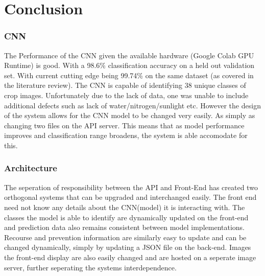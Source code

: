 \chapter{Conclusion}
\label{conclusion}
  \subsection{CNN}
    The Performance of the CNN given the available hardware (Google Colab GPU Runtime) is good. With a 98.6\% classification accuracy on a held out validation set. With current cutting edge being 99.74\% on the same dataset (as covered in the literature review). The CNN is capable of identifying 38 unique classes of crop images. Unfortunately due to the lack of data, one was unable to include additional defects such as lack of water/nitrogen/sunlight etc. However the design of the system allows for the CNN model to be changed very easily. As simply as changing two files on the API server. This means that as model performance improves and classification range broadens, the system is able accomodate for this.

  \subsection{Architecture}
    The seperation of responsibility between the API and Front-End has created two orthogonal systems that can be upgraded and interchanged easily. The front end need not know any details about the CNN(model) it is interacting with. The classes the model is able to identify are dynamically updated on the front-end and prediction data also remains consistent between model implementations. Recourse and prevention information are similarly easy to update and can be changed dynamically, simply by updating a JSON file on the back-end. Images the front-end display are also easily changed and are hosted on a seperate image server, further seperating the systems interdependence.

